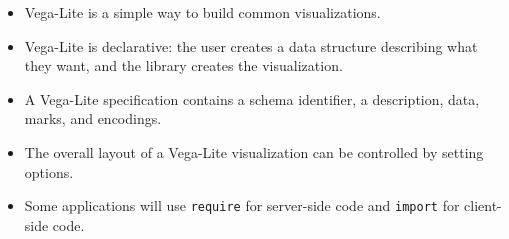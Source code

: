 \begin{itemize}
\item
  Vega-Lite is a simple way to build common visualizations.
\item
  Vega-Lite is declarative: the user creates a data structure describing what they want, and the library creates the visualization.
\item
  A Vega-Lite specification contains a schema identifier, a description, data, marks, and encodings.
\item
  The overall layout of a Vega-Lite visualization can be controlled by setting options.
\item
  Some applications will use \texttt{require} for server-side code and \texttt{import} for client-side code.
\end{itemize}
